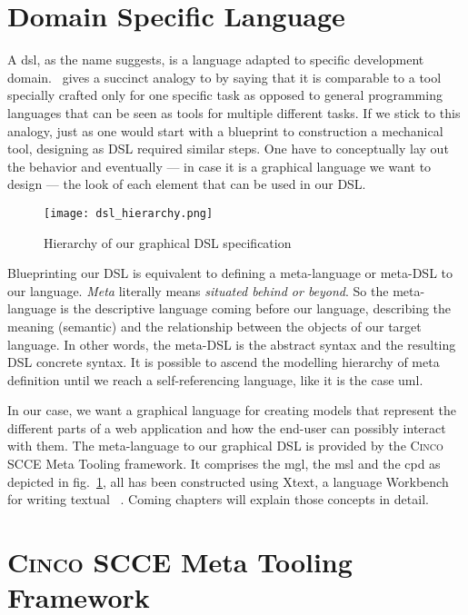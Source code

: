 \section{Domain Specific Language}

A \acrfull{dsl}, as the name suggests, is a language adapted to specific development domain.~\cite{Naujokat2018} gives a succinct analogy to  by saying that it is comparable to a tool specially crafted only for one specific task as opposed to general programming languages that can be seen as tools for multiple different tasks. If we stick to this analogy, just as one would start with a blueprint to construction a mechanical tool, designing as DSL required similar steps. One have to conceptually lay out the behavior and eventually --- in case it is a graphical language we want to design --- the look of each element that can be used in our DSL. 

\begin{figure}[H]
    \texttt{[image: dsl\_hierarchy.png]}
    \caption{Hierarchy of our graphical DSL specification}\label{fig:modelling-hierachy}
\end{figure}

Blueprinting our DSL is equivalent to defining a meta-language or meta-DSL to our language. \textit{Meta} literally means \textit{situated behind or beyond}. So the meta-language is the descriptive language coming before our language, describing the meaning (semantic) and the relationship between the objects of our target language. In other words, the meta-DSL is the abstract syntax and the resulting DSL concrete syntax. It is possible to ascend the modelling hierarchy of meta definition until we reach a self-referencing language, like it is the case \acrfull{uml}.

In our case, we want a graphical language for creating models that represent the different parts of a web application and how the end-user can possibly interact with them. The meta-language to our graphical DSL is provided by the \textsc{Cinco} SCCE Meta Tooling framework. It comprises the \acrfull{mgl}, the \acrfull{msl} and the \acrfull{cpd} as depicted in fig.~\ref{fig:modelling-hierachy}, all has been constructed using Xtext, a language Workbench for writing textual ~\cite{naujokat-diss}. Coming chapters will explain those concepts in detail.

\section{\textsc{Cinco SCCE} Meta Tooling Framework}\label{sec:cincoTool}

